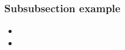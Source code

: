 \lipsum[2]
\subsubsection{Subsubsection example}

	\lipsum[2]
	\begin{itemize}
		\item \lipsum[2]
		\item \lipsum[2]
	\end{itemize}
